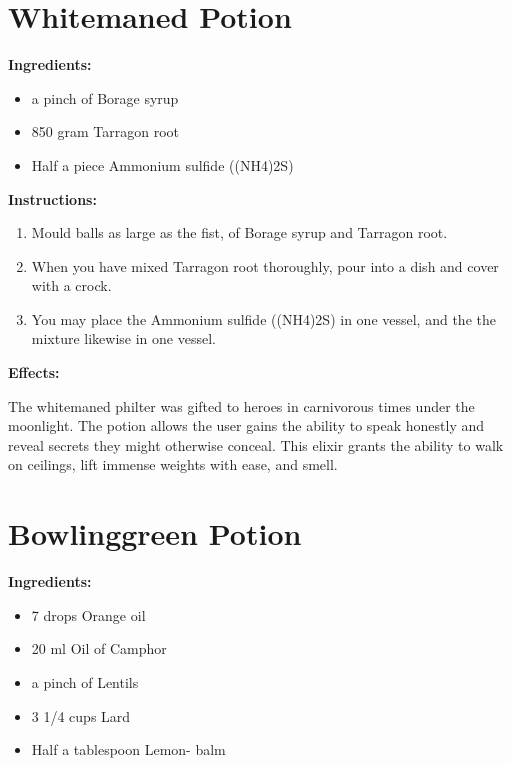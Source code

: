 \documentclass{article}
\begin{document}
\newpage
\section*{Whitemaned Potion}

\textbf{Ingredients:}

\begin{itemize}
  \item a pinch of Borage syrup
  \item 850 gram Tarragon root
  \item Half a piece Ammonium sulfide ((NH4)2S)
\end{itemize}

\textbf{Instructions:}

\begin{enumerate}
  \item Mould balls as large as the fist, of Borage syrup and Tarragon root.
  \item When you have mixed Tarragon root thoroughly, pour into a dish and cover with a crock.
  \item You may place the Ammonium sulfide ((NH4)2S) in one vessel, and the the mixture likewise in one vessel.
\end{enumerate}

\textbf{Effects:}

The whitemaned philter was gifted to heroes in carnivorous times under the moonlight. The potion allows the user gains the ability to speak honestly and reveal secrets they might otherwise conceal. This elixir grants the ability to walk on ceilings, lift immense weights with ease, and smell.

\newpage
\section*{Bowlinggreen Potion}

\textbf{Ingredients:}

\begin{itemize}
  \item 7 drops Orange oil
  \item 20 ml Oil of Camphor
  \item a pinch of Lentils
  \item 3 1/4 cups Lard
  \item Half a tablespoon Lemon- balm
\end{itemize}
\end{document}
